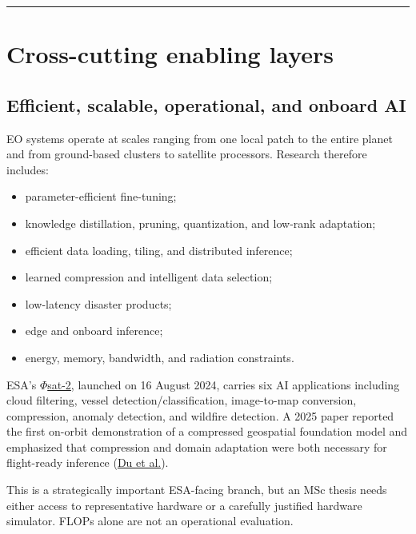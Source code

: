 \documentclass[
  a4paper,
  11pt]{article}
\providecommand{\tightlist}{%
  \setlength{\itemsep}{0pt}\setlength{\parskip}{0pt}}
\begin{document}
\begin{center}\rule{0.5\linewidth}{0.5pt}\end{center}

\hypertarget{cross-cutting-enabling-layers}{%
\section{Cross-cutting enabling
layers}\label{cross-cutting-enabling-layers}}

\hypertarget{efficient-scalable-operational-and-onboard-ai}{%
\subsection{Efficient, scalable, operational, and onboard
AI}\label{efficient-scalable-operational-and-onboard-ai}}

EO systems operate at scales ranging from one local patch to the entire
planet and from ground-based clusters to satellite processors. Research
therefore includes:

\begin{itemize}
\tightlist
\item
  parameter-efficient fine-tuning;
\item
  knowledge distillation, pruning, quantization, and low-rank
  adaptation;
\item
  efficient data loading, tiling, and distributed inference;
\item
  learned compression and intelligent data selection;
\item
  low-latency disaster products;
\item
  edge and onboard inference;
\item
  energy, memory, bandwidth, and radiation constraints.
\end{itemize}

ESA's
\href{https://www.esa.int/Applications/Observing_the_Earth/Phsat-2}{\(\Phi\)sat-2},
launched on 16 August 2024, carries six AI applications including cloud
filtering, vessel detection/classification, image-to-map conversion,
compression, anomaly detection, and wildfire detection. A 2025 paper
reported the first on-orbit demonstration of a compressed geospatial
foundation model and emphasized that compression and domain adaptation
were both necessary for flight-ready inference
(\href{https://arxiv.org/abs/2512.01181}{Du et al.}).

This is a strategically important ESA-facing branch, but an MSc thesis
needs either access to representative hardware or a carefully justified
hardware simulator. FLOPs alone are not an operational evaluation.
\end{document}
